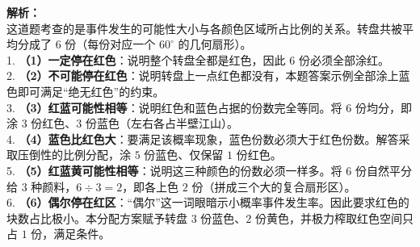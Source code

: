 \begin{center}
\end{center}

\vspace{0.8cm}

{\small\color{gray}
\textbf{解析：}\\
这道题考查的是事件发生的可能性大小与各颜色区域所占比例的关系。转盘共被平均分成了 $6$ 份（每份对应一个 $60^\circ$ 的几何扇形）。\\
1. \textbf{（1）一定停在红色}：说明整个转盘全都是红色，因此 $6$ 份必须全部涂红。\\
2. \textbf{（2）不可能停在红色}：说明转盘上一点红色都没有，本题答案示例全部涂上蓝色即可满足“绝无红色”的约束。\\
3. \textbf{（3）红蓝可能性相等}：说明红色和蓝色占据的份数完全等同。将 $6$ 份均分，即涂 $3$ 份红色、$3$ 份蓝色（左右各占半壁江山）。\\
4. \textbf{（4）蓝色比红色大}：要满足该概率现象，蓝色份数必须大于红色份数。解答采取压倒性的比例分配，涂 $5$ 份蓝色、仅保留 $1$ 份红色。\\
5. \textbf{（5）红蓝黄可能性相等}：说明这三种颜色的份数必须一样多。将 $6$ 份自然平分给 $3$ 种颜料，$6 \div 3 = 2$，即各上色 $2$ 份（拼成三个大的复合扇形区）。\\
6. \textbf{（6）偶尔停在红区}：“偶尔”这一词眼暗示小概率事件发生率。因此要求红色的块数占比极小。本分配方案赋予转盘 $3$ 份蓝色、$2$ 份黄色，并极力榨取红色空间只占 $1$ 份，满足条件。
}

